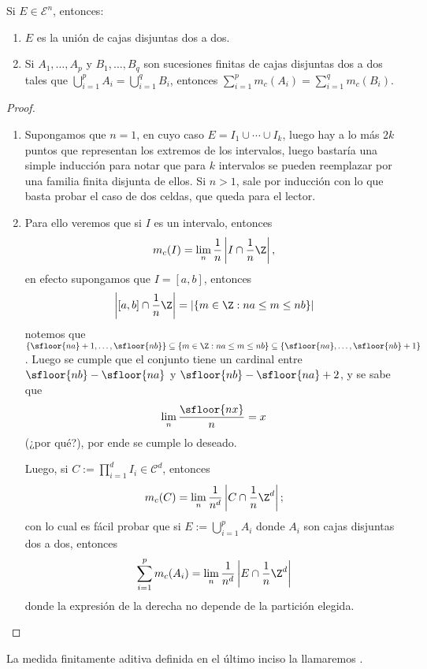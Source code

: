 \begin{lem}
	Si $E\in\mathcal{E}^n$, entonces:
	\begin{enumerate}
		\item $E$ es la unión de cajas disjuntas dos a dos.
		\item Si $A_1,\dots,A_p$ y $B_1,\dots,B_q$ son sucesiones finitas de cajas disjuntas dos a dos tales que
			$\bigcup_{i=1}^p A_i = \bigcup_{i=1}^q B_i$, entonces $\sum_{i=1}^p m_c(A_i) = \sum_{i=1}^q m_c(B_i)$.
	\end{enumerate}
\end{lem}
\begin{proof}
	\begin{enumerate}
		\item Supongamos que $n=1$, en cuyo caso $E = I_1\cup\cdots\cup I_k$, luego hay a lo más $2k$ puntos que representan
			los extremos de los intervalos, luego bastaría una simple inducción para notar que para $k$ intervalos se
			pueden reemplazar por una familia finita disjunta de ellos.
			Si $n > 1$, sale por inducción con lo que basta probar el caso de dos celdas, que queda para el lector.

		\item Para ello veremos que si $I$ es un intervalo, entonces
			$$ m_c(I) = \lim_n \frac{1}{n} \left| I\cap \frac{1}{n}\Z \right|, $$
			en efecto supongamos que $I = [a,b]$, entonces
			$$ \left| [a,b]\cap \frac{1}{n}\Z \right| = |\{m\in\Z: na\le m\le nb \}| $$
			notemos que $\{ \sfloor{na}+1,\dots,\sfloor{nb} \} \subseteq \{m\in\Z : na\le m\le nb\} \subseteq \{\sfloor{na}, \dots, \sfloor{nb}+1\}$.
			Luego se cumple que el conjunto tiene un cardinal entre $\sfloor{nb} - \sfloor{na}$ y $\sfloor{nb} - \sfloor{na} + 2$, y se sabe que
			$$ \lim_n \frac{\sfloor{nx}}{n} = x $$
			(¿por qué?), por ende se cumple lo deseado.
			\par
			Luego, si $C := \prod_{i=1}^d I_i \in \mathcal{C}^d$, entonces
			$$ m_c(C) = \lim_n \frac{1}{n^d} \left| C\cap \frac{1}{n}\Z^d \right|; $$
			con lo cual es fácil probar que si $E := \bigcup_{i=1}^p A_i$ donde $A_i$ son cajas disjuntas dos a dos, entonces
			$$ \sum_{i=1}^p m_c(A_i) = \lim_n \frac{1}{n^d} \left| E\cap \frac{1}{n}\Z^d \right| $$
			donde la expresión de la derecha no depende de la partición elegida. \qedhere
	\end{enumerate}
\end{proof}
La medida finitamente aditiva definida en el último inciso la llamaremos .

